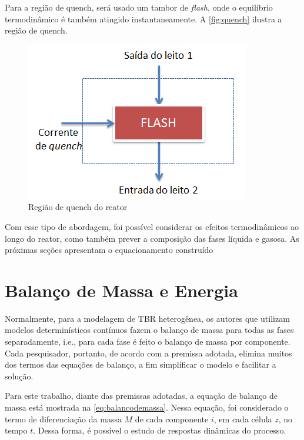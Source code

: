 
Para a região de quench, será usado um tambor de \emph{flash}, onde o equilíbrio
termodinâmico é também atingido instantaneamente. A \autoref{fig:quench} ilustra
a região de quench.

 \begin{figure}[htb]
 \centering \includegraphics[scale=0.75]{images/Chap3/quench.png}
 \caption{Região de quench do reator}
 \label{fig:quench}
 \end{figure}

Com esse tipo de abordagem, foi possível considerar os efeitos termodinâmicos
ao longo do reator, como também prever a composição das fases líquida e
gasosa. As próximas seções apresentam o equacionamento construído

\section{Balanço de Massa e Energia} \label{sec:balancomassaenergia}

Normalmente, para a modelagem de TBR heterogênea, os autores que utilizam
modelos determinísticos contínuos fazem o balanço de massa para todas as
fases separadamente, i.e., para cada fase é feito o balanço de massa por
componente. %
Cada pesquisador, portanto, de acordo com a premissa adotada, elimina muitos dos
termos das equações de balanço, a fim simplificar o modelo e facilitar a
solução. 

Para este trabalho, diante das premissas adotadas, a equação de balanço de massa
está mostrada na \autoref{eq:balancodemassa}. Nessa equação, foi considerado o
termo de diferenciação da massa $M$ de cada componente $i$, em cada célula $z$,
no tempo $t$. Dessa forma, é possível o estudo de respostas dinâmicas do
processo.

